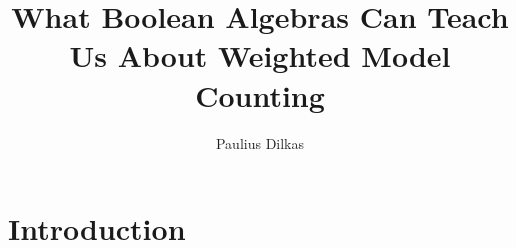 \documentclass{article}
\title{What Boolean Algebras Can Teach Us About Weighted Model Counting}
\author{Paulius Dilkas}
\theoremstyle{definition}
\theoremstyle{remark}
\begin{document}
\maketitle

\section{Introduction}




\end{document}
